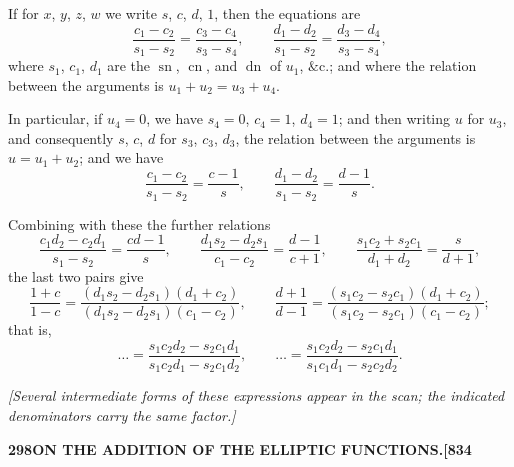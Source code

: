 \documentclass[11pt]{article}
\begin{document}
\medskip

If for $x$, $y$, $z$, $w$ we write $s$, $c$, $d$, $1$, then the equations are
\[
\frac{c_{1} - c_{2}}{s_{1} - s_{2}} = \frac{c_{3} - c_{4}}{s_{3} - s_{4}},\qquad \frac{d_{1} - d_{2}}{s_{1} - s_{2}} = \frac{d_{3} - d_{4}}{s_{3} - s_{4}},
\]
where $s_{1}$, $c_{1}$, $d_{1}$ are the $\operatorname{sn}$, $\operatorname{cn}$, and $\operatorname{dn}$ of $u_{1}$, $\&\text{c.}$; and where the relation between the arguments is $u_{1} + u_{2} = u_{3} + u_{4}$.

\medskip

In particular, if $u_{4} = 0$, we have $s_{4} = 0$, $c_{4} = 1$, $d_{4} = 1$; and then writing $u$ for $u_{3}$, and consequently $s$, $c$, $d$ for $s_{3}$, $c_{3}$, $d_{3}$, the relation between the arguments is $u = u_{1} + u_{2}$; and we have
\[
\frac{c_{1} - c_{2}}{s_{1} - s_{2}} = \frac{c - 1}{s},\qquad \frac{d_{1} - d_{2}}{s_{1} - s_{2}} = \frac{d - 1}{s}.
\]

\medskip

Combining with these the further relations
\[
\frac{c_{1}d_{2} - c_{2}d_{1}}{s_{1} - s_{2}} = \frac{c d - 1}{s},\qquad \frac{d_{1}s_{2} - d_{2}s_{1}}{c_{1} - c_{2}} = \frac{d - 1}{c + 1},\qquad \frac{s_{1}c_{2} + s_{2}c_{1}}{d_{1} + d_{2}} = \frac{s}{d + 1},
\]
the last two pairs give
\[
\frac{1 + c}{1 - c} = \frac{(d_{1}s_{2} - d_{2}s_{1})(d_{1} + c_{2})}{(d_{1}s_{2} - d_{2}s_{1})(c_{1} - c_{2})},\qquad \frac{d + 1}{d - 1} = \frac{(s_{1}c_{2} - s_{2}c_{1})(d_{1} + c_{2})}{(s_{1}c_{2} - s_{2}c_{1})(c_{1} - c_{2})};
\]
that is,
\[
\ldots = \frac{s_{1}c_{2}d_{2} - s_{2}c_{1}d_{1}}{s_{1}c_{2}d_{1} - s_{2}c_{1}d_{2}},\qquad \ldots = \frac{s_{1}c_{2}d_{2} - s_{2}c_{1}d_{1}}{s_{1}c_{1}d_{1} - s_{2}c_{2}d_{2}}.
\]

\medskip

\noindent\textit{[Several intermediate forms of these expressions appear in the scan; the indicated denominators carry the same factor.]}

\newpage

\noindent\textbf{298}\hfill\textbf{ON THE ADDITION OF THE ELLIPTIC FUNCTIONS.}\hfill\textbf{[834}

\bigskip
\end{document}
